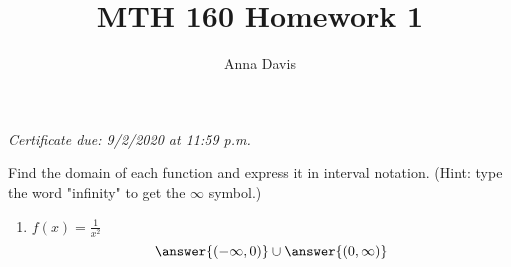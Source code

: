 \documentclass{ximera}
\author{Anna Davis} \title{MTH 160 Homework 1}
\begin{document}
\begin{abstract}

\end{abstract}
\maketitle
 \textit{Certificate due: 9/2/2020 at 11:59 p.m.}
\begin{problem}\label{prob:160hom2prob1}
Find the domain of each function and express it in interval notation.  (Hint: type the word "infinity" to get the $\infty$ symbol.)
\begin{enumerate}
    \item $f(x)=\frac{1}{x^2}$
    $$\answer{(-\infty,0)}\cup\answer{(0,\infty)}$$
\end{enumerate}
\end{problem}

\begin{problem}\label{prob:160hom2prob2}
  
\end{problem}

\begin{problem}\label{prob:160hom2prob3}

\end{problem}

\begin{problem}\label{prob:160hom2prob4}

\end{problem}

\begin{problem}\label{prob:160hom2prob5}

\end{problem}

\begin{problem}\label{prob:160hom2prob6}

\end{problem}
\end{document}
